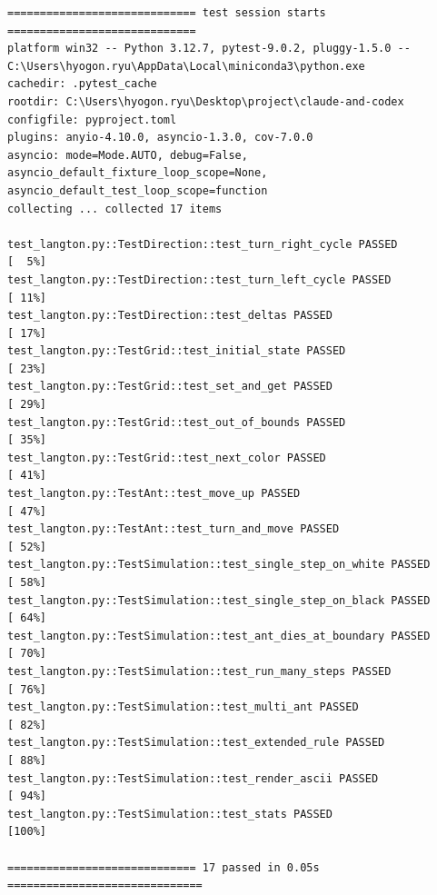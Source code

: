 \documentclass[11pt,a4paper]{article}
\begin{document}
\begin{lstlisting}
============================= test session starts =============================
platform win32 -- Python 3.12.7, pytest-9.0.2, pluggy-1.5.0 -- C:\Users\hyogon.ryu\AppData\Local\miniconda3\python.exe
cachedir: .pytest_cache
rootdir: C:\Users\hyogon.ryu\Desktop\project\claude-and-codex
configfile: pyproject.toml
plugins: anyio-4.10.0, asyncio-1.3.0, cov-7.0.0
asyncio: mode=Mode.AUTO, debug=False, asyncio_default_fixture_loop_scope=None, asyncio_default_test_loop_scope=function
collecting ... collected 17 items

test_langton.py::TestDirection::test_turn_right_cycle PASSED             [  5%]
test_langton.py::TestDirection::test_turn_left_cycle PASSED              [ 11%]
test_langton.py::TestDirection::test_deltas PASSED                       [ 17%]
test_langton.py::TestGrid::test_initial_state PASSED                     [ 23%]
test_langton.py::TestGrid::test_set_and_get PASSED                       [ 29%]
test_langton.py::TestGrid::test_out_of_bounds PASSED                     [ 35%]
test_langton.py::TestGrid::test_next_color PASSED                        [ 41%]
test_langton.py::TestAnt::test_move_up PASSED                            [ 47%]
test_langton.py::TestAnt::test_turn_and_move PASSED                      [ 52%]
test_langton.py::TestSimulation::test_single_step_on_white PASSED        [ 58%]
test_langton.py::TestSimulation::test_single_step_on_black PASSED        [ 64%]
test_langton.py::TestSimulation::test_ant_dies_at_boundary PASSED        [ 70%]
test_langton.py::TestSimulation::test_run_many_steps PASSED              [ 76%]
test_langton.py::TestSimulation::test_multi_ant PASSED                   [ 82%]
test_langton.py::TestSimulation::test_extended_rule PASSED               [ 88%]
test_langton.py::TestSimulation::test_render_ascii PASSED                [ 94%]
test_langton.py::TestSimulation::test_stats PASSED                       [100%]

============================= 17 passed in 0.05s ==============================
\end{lstlisting}
\end{document}
